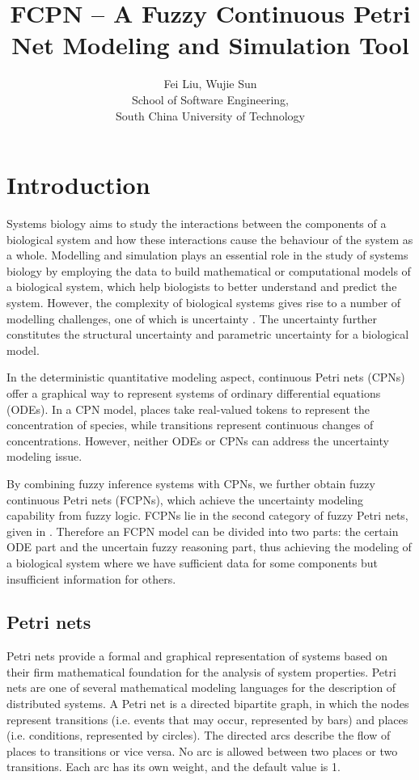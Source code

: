 \documentclass[journal,a4paper,onecolumn]{article}
\begin{document}
	\title{FCPN -- A Fuzzy Continuous Petri Net Modeling and Simulation Tool}
	\author{Fei Liu, Wujie Sun\\
	School of Software Engineering, \\South China University of Technology}
\maketitle
\clearpage

\tableofcontents
\clearpage


\section{Introduction}

Systems biology \cite{Kit02}
aims to study the interactions between the components of a biological system and how these interactions cause the behaviour of the system as a whole. Modelling and simulation plays an essential role in the study of systems biology by employing the data to build mathematical or computational models of a biological system, which help biologists to better understand and predict the system. However, the complexity of biological systems gives rise to a number of modelling challenges, one of which is uncertainty \cite{GRH00}.
The uncertainty further constitutes the structural uncertainty and parametric uncertainty for a biological model.

In the deterministic quantitative modeling aspect, continuous Petri nets (CPNs) \cite{BGH+08} offer a graphical way to represent systems of ordinary differential equations (ODEs). In a CPN model, places take real-valued tokens to represent the concentration of species, while transitions represent continuous changes of concentrations. However, neither ODEs or CPNs can address the uncertainty modeling issue.

By combining fuzzy inference systems \cite{Zad65,WRK07} with CPNs, we further obtain fuzzy continuous Petri nets (FCPNs), which achieve the uncertainty modeling capability from fuzzy logic.
FCPNs lie in the second category of fuzzy Petri nets, given in \cite{LHG18}. Therefore an FCPN model can be divided into two parts: the certain ODE part and the uncertain fuzzy reasoning part, thus achieving the modeling of a biological system where we have sufficient data for some components but insufficient information for others.


\subsection{Petri nets}
Petri nets \cite{Mur89} provide a formal and graphical representation of systems based on their firm mathematical foundation for the analysis of system properties. 
Petri nets are one of several mathematical modeling languages for the description of distributed systems. 
A Petri net is a directed bipartite graph, in which the nodes represent transitions (i.e. events that may occur, represented by bars) and places (i.e. conditions, represented by circles). The directed arcs describe the flow of places to transitions or vice versa. No arc is allowed between two places or two transitions. Each arc has its own weight, and the default value is 1.
\end{document}
